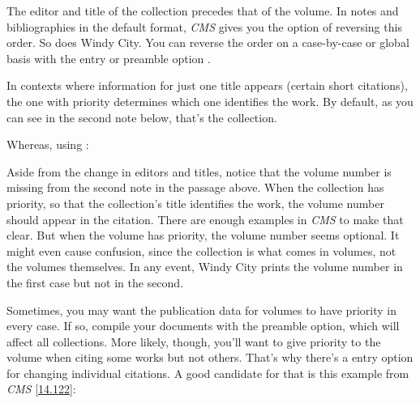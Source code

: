 \documentclass[11pt,letterpaper,oneside]{article}
\begin{document}
\begin{citebib}
\item \cite{armstrong2014}
\end{citebib}

\noindent The editor and title of the collection precedes that of the
volume. In notes and bibliographies in the default format,
\textit{CMS} gives you the option of reversing this order. So does
Windy City. You can reverse the order on a case-by-case or global
basis with the entry or preamble option .

\begin{citebib}
\item \cite{armstrong2014}
\end{citebib}

In contexts where information for just one title appears (certain
short citations), the one with priority determines which one
identifies the work. By default, as you can see in the second note
below, that's the collection.

\begin{citeonly}
\item \cite{armstrong2014}
\item \cite[45]{armstrong2014}
\end{citeonly}

\noindent Whereas, using :

\begin{citeonly}
\item \cite{armstrong2014}
\item \cite[45]{armstrong2014}
\end{citeonly}

Aside from the change in editors and titles, notice that the volume
number is missing from the second note in the passage above. When the
collection has priority, so that the collection's title identifies the
work, the volume number should appear in the citation. There are
enough examples in \textit{CMS} to make that clear. But when the
volume has priority, the volume number seems optional. It might even
cause confusion, since the collection is what comes in volumes, not
the volumes themselves. In any event, Windy City prints the volume
number in the first case but not in the second.

Sometimes, you may want the publication data for volumes to have
priority in every case. If so, compile your documents with the
 preamble option, which will affect all collections.
More likely, though, you'll want to give priority to the volume when
citing some works but not others. That's why there's a 
entry option for changing individual citations. A good candidate for
that is this example from \textit{CMS} \ref{14.122}:
\end{document}
